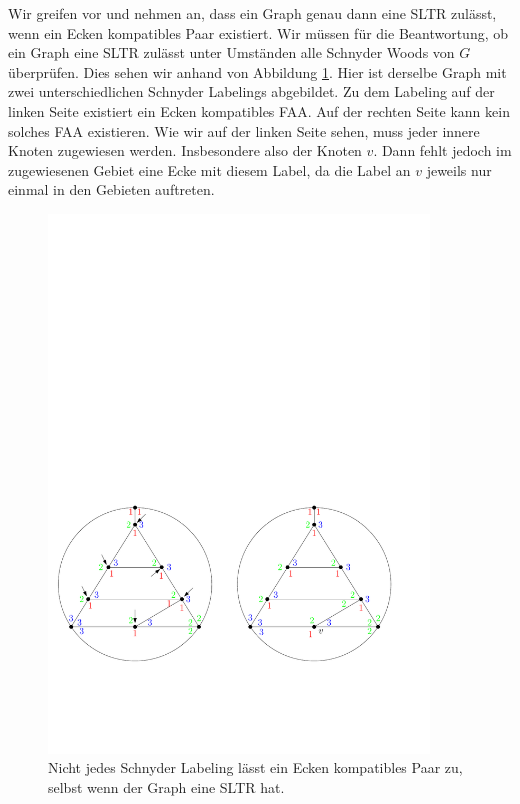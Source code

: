 \begin{example}
Wir greifen vor und nehmen an, dass ein Graph genau dann eine SLTR zulässt, wenn ein Ecken kompatibles Paar existiert. Wir müssen für die Beantwortung, ob ein Graph eine SLTR zulässt unter Umständen alle Schnyder Woods von $G$ überprüfen. Dies sehen wir anhand von Abbildung \ref{exp_ccc}. Hier ist derselbe Graph mit zwei unterschiedlichen Schnyder Labelings abgebildet. Zu dem Labeling auf der linken Seite existiert ein Ecken kompatibles FAA. Auf der rechten Seite kann kein solches FAA existieren. Wie wir auf der linken Seite sehen, muss jeder innere Knoten zugewiesen werden. Insbesondere also der Knoten $v$. Dann fehlt jedoch im zugewiesenen Gebiet eine Ecke mit diesem Label, da die Label an $v$ jeweils nur einmal in den Gebieten auftreten.

\begin{figure}[h]
\centering
\includegraphics[width=0.9\textwidth]{exp_ccc.pdf}
\caption{Nicht jedes Schnyder Labeling lässt ein Ecken kompatibles Paar zu, selbst wenn der Graph eine SLTR hat.}
\label{exp_ccc}
\end{figure}

\end{example}

